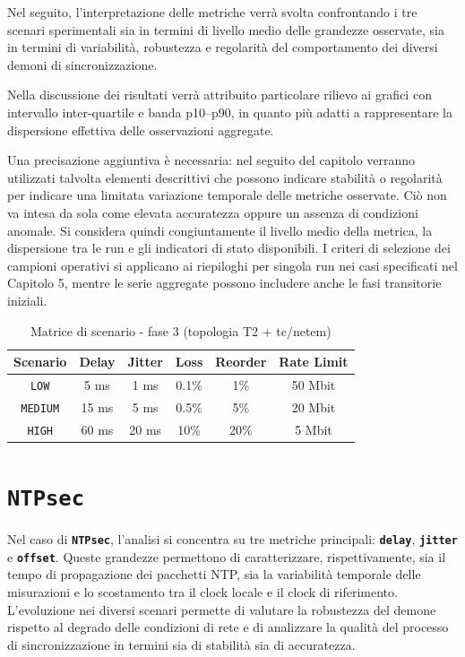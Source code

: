 Nel seguito, l'interpretazione delle metriche verrà svolta confrontando i tre
scenari sperimentali sia in termini di livello medio delle grandezze osservate, sia
in termini di variabilità, robustezza e regolarità del comportamento dei diversi
demoni di sincronizzazione.

Nella discussione dei risultati verrà attribuito particolare rilievo ai grafici
con intervallo inter-quartile e banda p10--p90, in quanto più adatti a
rappresentare la dispersione effettiva delle osservazioni aggregate.

Una precisazione aggiuntiva è necessaria: nel seguito del capitolo verranno utilizzati talvolta
elementi descrittivi che possono indicare stabilità o regolarità per indicare una limitata 
variazione temporale delle metriche osservate. Ciò non va intesa da sola come elevata accuratezza oppure
un assenza di condizioni anomale. Si considera quindi congiuntamente il livello medio della metrica,
 la dispersione tra le run e gli indicatori di stato disponibili. 
I criteri di selezione dei campioni operativi si applicano ai riepiloghi per singola run nei casi specificati nel Capitolo 5, 
mentre le serie aggregate possono includere anche le fasi transitorie iniziali.

\begin{table}[H]
  \centering
  \caption{Matrice di scenario - fase 3 (topologia T2 + tc/netem)}
  \begin{tabular}{|c|c|c|c|c|c|}
    \hline
    \textbf{Scenario} & \textbf{Delay} & \textbf{Jitter} & \textbf{Loss} & \textbf{Reorder} & \textbf{Rate Limit} \\
    \hline
    \texttt{LOW}      & 5 ms           & 1 ms            & 0.1\%         & 1\%              & 50 Mbit             \\
    \hline
    \texttt{MEDIUM}   & 15 ms          & 5 ms            & 0.5\%         & 5\%              & 20 Mbit             \\
    \hline
    \texttt{HIGH}     & 60 ms          & 20 ms           & 10\%          & 20\%             & 5 Mbit              \\
    \hline
  \end{tabular}
  \label{tab:scenario_matrix}
\end{table}
\section{\texttt{NTPsec}}

Nel caso di \texttt{\textbf{NTPsec}}, l'analisi si concentra su tre metriche principali:
\texttt{\textbf{delay}}, \texttt{\textbf{jitter}} e \texttt{\textbf{offset}}. Queste
grandezze permettono di caratterizzare, rispettivamente, sia il tempo di propagazione
dei pacchetti NTP, sia la variabilità temporale delle misurazioni e lo
scostamento tra il clock locale e il clock di riferimento. L'evoluzione nei diversi
scenari permette di valutare la robustezza del demone rispetto al degrado delle condizioni
di rete e di analizzare la qualità del processo di sincronizzazione in termini sia
di stabilità sia di accuratezza.

